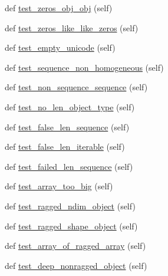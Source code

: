 \begin{DoxyCompactItemize}
def \hyperlink{classnumpy_1_1core_1_1tests_1_1test__multiarray_1_1TestCreation_a673a15ce9955bb5ab5cadce717f22423}{test\+\_\+zeros\+\_\+obj\+\_\+obj} (self)
\item 
def \hyperlink{classnumpy_1_1core_1_1tests_1_1test__multiarray_1_1TestCreation_ad260a9188204824abb96c236e7636543}{test\+\_\+zeros\+\_\+like\+\_\+like\+\_\+zeros} (self)
\item 
def \hyperlink{classnumpy_1_1core_1_1tests_1_1test__multiarray_1_1TestCreation_a4a26f7052861652c00b45330d2714cd4}{test\+\_\+empty\+\_\+unicode} (self)
\item 
def \hyperlink{classnumpy_1_1core_1_1tests_1_1test__multiarray_1_1TestCreation_a2f142814060206b9e5572c00d3286821}{test\+\_\+sequence\+\_\+non\+\_\+homogeneous} (self)
\item 
def \hyperlink{classnumpy_1_1core_1_1tests_1_1test__multiarray_1_1TestCreation_a5992c3151c027fc34d34045d87fba0d5}{test\+\_\+non\+\_\+sequence\+\_\+sequence} (self)
\item 
def \hyperlink{classnumpy_1_1core_1_1tests_1_1test__multiarray_1_1TestCreation_a9dbdbe01fd2456076091a01702db143e}{test\+\_\+no\+\_\+len\+\_\+object\+\_\+type} (self)
\item 
def \hyperlink{classnumpy_1_1core_1_1tests_1_1test__multiarray_1_1TestCreation_a5123dbc5ccd87132531e5ba107902a16}{test\+\_\+false\+\_\+len\+\_\+sequence} (self)
\item 
def \hyperlink{classnumpy_1_1core_1_1tests_1_1test__multiarray_1_1TestCreation_aa51a49283239624cb8ded9014c8dee77}{test\+\_\+false\+\_\+len\+\_\+iterable} (self)
\item 
def \hyperlink{classnumpy_1_1core_1_1tests_1_1test__multiarray_1_1TestCreation_a68a5c230139fd3dac9bece03cb34e397}{test\+\_\+failed\+\_\+len\+\_\+sequence} (self)
\item 
def \hyperlink{classnumpy_1_1core_1_1tests_1_1test__multiarray_1_1TestCreation_a81db3bf2c97832941cde183c2c5b3577}{test\+\_\+array\+\_\+too\+\_\+big} (self)
\item 
def \hyperlink{classnumpy_1_1core_1_1tests_1_1test__multiarray_1_1TestCreation_ad6a027e8a83347bbae3f1dcb2a3783ae}{test\+\_\+ragged\+\_\+ndim\+\_\+object} (self)
\item 
def \hyperlink{classnumpy_1_1core_1_1tests_1_1test__multiarray_1_1TestCreation_a58dc7c1a56e76f898a7d473c66f32c9e}{test\+\_\+ragged\+\_\+shape\+\_\+object} (self)
\item 
def \hyperlink{classnumpy_1_1core_1_1tests_1_1test__multiarray_1_1TestCreation_ae24bee6fd6e745a797044a5a8664ca4b}{test\+\_\+array\+\_\+of\+\_\+ragged\+\_\+array} (self)
\item 
def \hyperlink{classnumpy_1_1core_1_1tests_1_1test__multiarray_1_1TestCreation_a439054498757c5684e3ff3ff639232bf}{test\+\_\+deep\+\_\+nonragged\+\_\+object} (self)
\end{DoxyCompactItemize}
